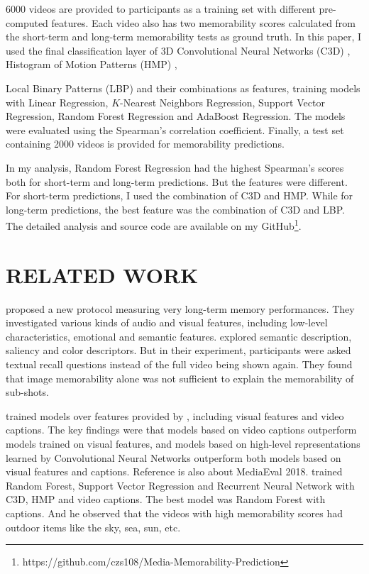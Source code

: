 \documentclass[conference, compsoc]{IEEEtran}
\begin{document}
6000 videos are provided to participants as a training set with different pre-computed features.
Each video also has two memorability scores calculated from the short-term and long-term memorability tests as ground truth.
In this paper, I used the final classification layer of 3D Convolutional Neural Networks (C3D) \cite{DBLP:journals/corr/TranBFTP14}, Histogram of Motion Patterns (HMP) \cite{6116516}, {Local Binary Patterns (LBP) \cite{572934} and their combinations as features,
training models with Linear Regression, $K$-Nearest Neighbors Regression, Support Vector Regression, Random Forest Regression and AdaBoost Regression.
The models were evaluated using the Spearman's correlation coefficient.
Finally, a test set containing 2000 videos is provided for memorability predictions.

In my analysis, Random Forest Regression had the highest Spearman's scores both for short-term and long-term predictions.
But the features were different.
For short-term predictions, I used the combination of C3D and HMP.
While for long-term predictions, the best feature was the combination of C3D and LBP.
The detailed analysis and source code are available on my GitHub\footnote{https://github.com/czs108/Media-Memorability-Prediction}.


\section{RELATED WORK}
\citeauthor{10.1145/3206025.3206056} \cite{10.1145/3206025.3206056} proposed a new protocol measuring very long-term memory performances.
They investigated various kinds of audio and visual features,
including low-level characteristics, emotional and semantic features.
\citeauthor{DBLP:journals/corr/ShekharSSKS17} \cite{DBLP:journals/corr/ShekharSSKS17} explored semantic description, saliency and color descriptors.
But in their experiment, participants were asked textual recall questions instead of the full video being shown again.
They found that image memorability alone was not sufficient to explain the memorability of sub-shots.

\citeauthor{Gupta2018LinearMF} \cite{Gupta2018LinearMF} trained models over features provided by \cite{DBLP:journals/corr/abs-1807-01052},
including visual features and video captions.
The key findings were that models based on video captions outperform models trained on visual features,
and models based on high-level representations learned by Convolutional Neural Networks outperform both models based on visual features and captions.
Reference \cite{RajSingh-1994} is also about MediaEval 2018.
\citeauthor{RajSingh-1994} trained Random Forest, Support Vector Regression and Recurrent Neural Network with C3D, HMP and video captions.
The best model was Random Forest with captions.
And he observed that the videos with high memorability scores had outdoor items like the sky, sea, sun, etc.


}
\end{document}
